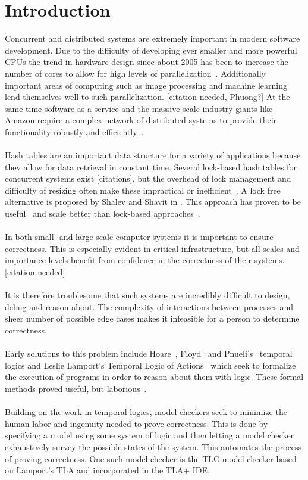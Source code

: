 \documentclass{uit-thesis}
\begin{document}
\chapter{Introduction}
Concurrent and distributed systems are extremely important in modern software development. Due to the difficulty of developing ever smaller and more powerful CPUs the trend in hardware design since about 2005 has been to increase the number of cores to allow for high levels of parallelization~\cite{Tanenbaum2014}. Additionally important areas of computing such as image processing and machine learning lend themselves well to such parallelization. [citation needed, Phuong?] At the same time software as a service and the massive scale industry giants like Amazon require a complex network of distributed systems to provide their functionality robustly and efficiently~\cite{Amazon2015}.
\\\\
Hash tables are an important data structure for a variety of applications because they allow for data retrieval in constant time. Several lock-based hash tables for concurrent systems exist [citations], but the overhead of lock management and difficulty of resizing often make these impractical or inefficient~\cite{Shalev2006}. A lock free alternative is proposed by Shalev and Shavit in \cite{Shalev2006}. This approach has proven to be useful~\cite{lock-free-structures2013} and scale better than lock-based approaches~\cite{Duarte-Haskell2016}.
\\\\
In both small- and large-scale computer systems it is important to ensure correctness. This is especially evident in critical infrastructure, but all scales and importance levels benefit from confidence in the correctness of their systems. [citation needed]
\\\\
It is therefore troublesome that such systems are incredibly difficult to design, debug and reason about. The complexity of interactions between processes and sheer number of possible edge cases makes it infeasible for a person to determine correctness.
\\\\
Early solutions to this problem include Hoare~\cite{Hoare1969}, Floyd~\cite{Floyd1967} and Pnueli's~\cite{Pnueli1977} temporal logics and Leslie Lamport's Temporal Logic of Actions~\cite{Lamport1977} which seek to formalize the execution of programs in order to reason about them with logic. These formal methods proved useful, but laborious~\cite{Clarke2009}.
\\\\
Building on the work in temporal logics, model checkers seek to minimize the human labor and ingenuity needed to prove correctness. This is done by specifying a model using some system of logic and then letting a model checker exhaustively survey the possible states of the system. This automates the process of proving correctness. One such model checker is the TLC model checker based on Lamport's TLA and incorporated in the TLA+ IDE.
\end{document}
